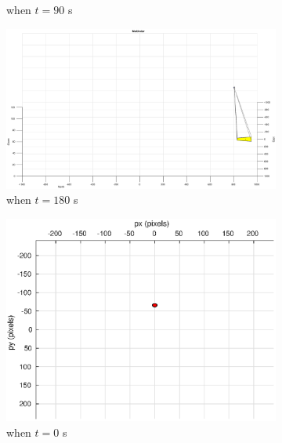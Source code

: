 \begin{figure}[htbp]
\begin{subfigure}[t]{0.32\linewidth}
		\caption{when $t=90$ s}
	\end{subfigure}
	\begin{subfigure}[t]{0.32\linewidth}
		\includegraphics[width=\textwidth]{images/chapter4/image_UAV_5mps_180s}
		\caption{when $t=180$ s}
	\end{subfigure}
	\begin{subfigure}[t]{0.32\linewidth}
		\includegraphics[width=\textwidth]{images/chapter4/image_camera_5mps}
		\caption{when $t=0$ s}
	\end{subfigure}
	\begin{subfigure}[t]{0.32\linewidth}

\end{subfigure}
\end{figure}
